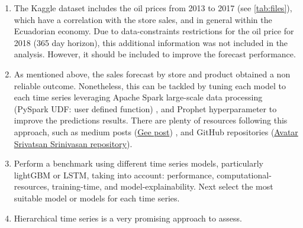 \begin{enumerate}
\item The Kaggle dataset includes the oil prices from 2013 to 2017 (see \autoref{tab:files}), which have a correlation with the store sales, and in general within the Ecuadorian economy. Due to data-constraints restrictions for the oil price for 2018  (365 day horizon), this additional information was not included in the analysis. However,  it should be included to improve the forecast performance. 
\item As mentioned above, the sales forecast by store and product obtained a non reliable outcome. Nonetheless, this can be tackled by tuning each model to each time series leveraging  Apache Spark\autocite{spark2018apache} large-scale data processing (PySpark UDF: user defined function) , and Prophet hyperparameter to improve the predictions results. There are plenty of resources following this approach, such as  medium posts (\href{https://higee.io/parallel-model-training-with-prophet-and-spark-5f40be750f97}{Gee post}) , and GitHub repositories (\href{https://github.com/srivatsan88/End-to-End-Time-Series/blob/master/Multiple_Time_Series_using_Apache_Spark_and_Prophet.ipynb}{Avatar Srivatsan Srinivasan repository}).
\item Perform a benchmark using different time series models, particularly lightGBM or LSTM, taking into account: performance, computational-resources, training-time, and model-explainability. Next select the most suitable model or models for each time series.
\item Hierarchical time series is a very promising approach to assess.   
\end{enumerate}
